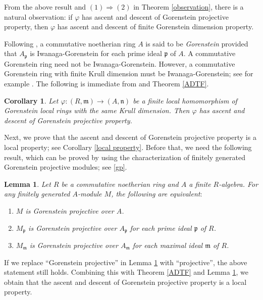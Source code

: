 \documentclass{amsart}
\newcommand{\n}{\mathfrak{n}}
\newcommand{\0}{{\bf{0}}}
\newcommand{\m}{\mathfrak{m}}
\newcommand{\p}{\mathfrak{p}}
\newtheorem{lemma}[theorem]{Lemma}
\newtheorem{corollary}[theorem]{Corollary}
\theoremstyle{definition}
\begin{document}
From the above result and $(1)\Rightarrow (2)$ in Theorem \ref{observation}, there is a natural observation: if $\varphi$ has ascent and descent of Gorenstein projective property, then $\varphi$ has ascent and descent of finite Gorenstein dimension property.


Following \cite[Definition 3.1.18]{BH}, a commutative noetherian ring $A$ is said to be \emph{Gorenstein} provided that $A_\p$ is Iwanaga-Gorenstein for each prime ideal $\p$ of $A$.  A commutative Gorenstein ring need not be Iwanaga-Gorenstein. However, a commutative Gorenstein ring with finite Krull dimension must be Iwanaga-Gorenstein; see for example \cite[Theorem 4.1.1]{Buc}. The following is immediate from \cite[Theorem 3.3.7]{BH} and Theorem \ref{ADTF}.

\begin{corollary}
Let $\varphi\colon (R, \m)\rightarrow (A, \n)$ be a finite local homomorphism of Gorenstein local rings with the same Krull dimension. Then $\varphi$ has ascent and descent of Gorenstein projective property.
\end{corollary}


Next, we prove that the ascent and descent of Gorenstein projective property is a local property; see Corollary \ref{local property}. Before that, we need the following result, which can be proved by using the characterization of finitely generated Gorenstein projective modules; see \ref{gp}.

\begin{lemma}\label{local GP}
Let $R$ be a commutative noetherian ring and $A$ a finite $R$-algebra. For any finitely generated  $A$-module $M$, the following are equivalent$\colon$
\begin{enumerate}
\item $M$ is Gorenstein projective over $A$.

\item $M_\p$ is Gorenstein projective over $A_\p$ for each prime ideal $\p$ of $R$.

\item $M_\m$ is Gorenstein projective over $A_\m$ for each maximal ideal $\m$ of $R$.
\end{enumerate}
\end{lemma}


If we replace ``Gorenstein projective'' in Lemma \ref{local GP} with ``projective'', the above statement still holds.
Combining this with Theorem \ref{ADTF} and Lemma \ref{local GP}, we obtain that the ascent and descent of Gorenstein projective property is a local property.
\end{document}
